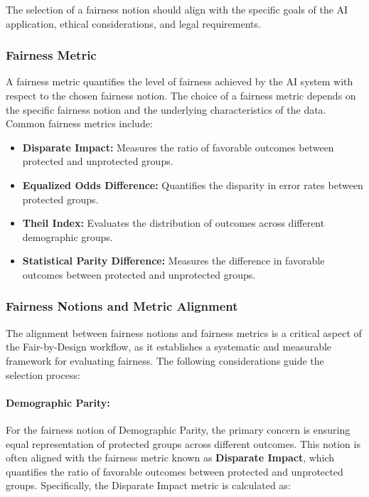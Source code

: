 The selection of a fairness notion should align with the specific goals of the AI application, ethical considerations, and legal requirements.

\subsubsection{Fairness Metric}

A fairness metric quantifies the level of fairness achieved by the AI system with respect to the chosen fairness notion. The choice of a fairness metric depends on the specific fairness notion and the underlying characteristics of the data. Common fairness metrics include:

\begin{itemize}
   
    \item \textbf{Disparate Impact:} Measures the ratio of favorable outcomes between protected and unprotected groups.
   
    \item \textbf{Equalized Odds Difference:} Quantifies the disparity in error rates between protected groups.
   
    \item \textbf{Theil Index:} Evaluates the distribution of outcomes across different demographic groups.
   
    \item \textbf{Statistical Parity Difference:} Measures the difference in favorable outcomes between protected and unprotected groups.

\end{itemize}

\subsubsection{Fairness Notions and Metric Alignment}
\label{subsub:alignment}

The alignment between fairness notions and fairness metrics is a critical aspect of the Fair-by-Design workflow, as it establishes a systematic and measurable framework for evaluating fairness. The following considerations guide the selection process:

\paragraph{Demographic Parity:}

For the fairness notion of Demographic Parity, the primary concern is ensuring equal representation of protected groups across different outcomes. This notion is often aligned with the fairness metric known as \textbf{Disparate Impact}, which quantifies the ratio of favorable outcomes between protected and unprotected groups. Specifically, the Disparate Impact metric is calculated as:

